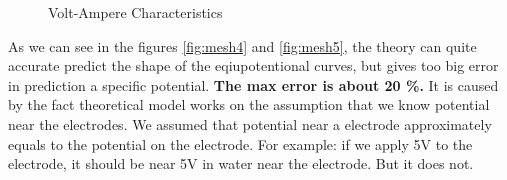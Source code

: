 \documentclass{article}
\begin{document}
\begin{figure}[htb!]
\begin{center}
\begin{minipage}[h]{0.47\linewidth}
\end{minipage}
\hfill
\begin{minipage}[h]{0.47\linewidth}
\end{minipage}

\end{center}
\caption{Volt-Ampere Characteristics}
\label{fig:mesh6}
\end{figure}


As we can see in the figures \ref{fig:mesh4} and \ref{fig:mesh5}, the theory can quite accurate predict the shape of the eqiupotentional curves, but gives too big error in prediction a specific potential. \textbf{The max error is about 20 \%.} It is caused by the fact theoretical model works on the assumption that we know potential near the electrodes. We assumed that potential near a electrode approximately equals to the potential on the electrode. For example: if we apply 5V to the electrode, it should be near 5V in water near the electrode. But it does not. \par
\end{document}
